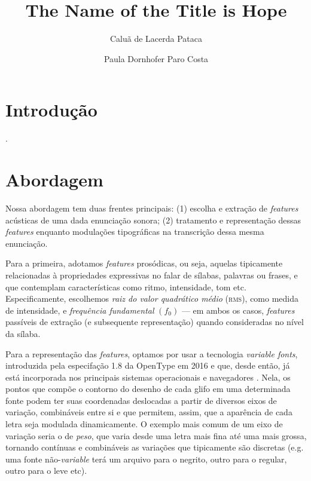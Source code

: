\documentclass[11pt]{article}
\title{The Name of the Title is Hope}
\author{Caluã de Lacerda Pataca \and Paula Dornhofer Paro Costa}
\begin{document}
\hyphenation{}
\pagestyle{fancy}


  \section{Introdu\c{c}\~{a}o}
  \label{sec:introducao}

   .

  \section{Abordagem}
  \label{sec:abordagem}
  
  Nossa abordagem tem duas frentes principais: (1) escolha e extração de {\itshape features} acústicas de uma dada enunciação sonora; (2) tratamento e representação dessas {\itshape features} enquanto modulações tipográficas na transcrição dessa mesma enunciação.
  
  Para a primeira, adotamos {\itshape features} prosódicas, ou seja, aquelas tipicamente relacionadas à propriedades expressivas no falar de sílabas, palavras ou frases, e que contemplam características como ritmo, intensidade, tom etc. Especificamente, escolhemos {\itshape raiz do valor quadrático médio} \textsc{(rms)}, como medida de intensidade, e {\itshape frequência fundamental} $(f_0)$ --- em ambos os casos, {\itshape features} passíveis de extração (e subsequente representação) quando consideradas no nível da sílaba.
  
  Para a representação das {\itshape features}, optamos por usar a tecnologia {\itshape variable fonts}, introduzida pela especifação 1.8 da OpenType \cite{varfontssepcs} em 2016 e que, desde então, já está incorporada nos principais sistemas operacionais \cite{varfontossupport} e navegadores \cite{varfontbrowsersupport}. Nela, os pontos que compõe o contorno do desenho de cada glifo em uma determinada fonte podem ter suas coordenadas deslocadas a partir de diversos eixos de variação, combináveis entre si e que permitem, assim, que a aparência de cada letra seja modulada dinamicamente. O exemplo mais comum de um eixo de variação seria o de {\itshape peso}, que varia desde uma letra mais fina até uma mais grossa, tornando contínuas e combináveis as variações que tipicamente são discretas (e.g. uma fonte não-{\itshape variable} terá um arquivo para o negrito, outro para o regular, outro para o leve etc).
  
\end{document}
